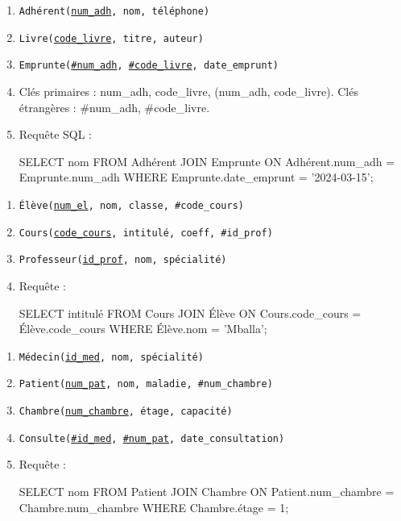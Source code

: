 \begin{enumerate}
    \item \texttt{Adhérent(\underline{num\_adh}, nom, téléphone)}
    \item \texttt{Livre(\underline{code\_livre}, titre, auteur)}
    \item \texttt{Emprunte(\underline{\#num\_adh}, \underline{\#code\_livre}, date\_emprunt)}
    \item Clés primaires : num\_adh, code\_livre, (num\_adh, code\_livre). Clés étrangères : \#num\_adh, \#code\_livre.
    \item Requête SQL :
    \begin{sqlcode}
SELECT nom FROM Adhérent
JOIN Emprunte ON Adhérent.num_adh = Emprunte.num_adh
WHERE Emprunte.date_emprunt = '2024-03-15';
    \end{sqlcode}
\end{enumerate}

\begin{enumerate}
    \item \texttt{Élève(\underline{num\_el}, nom, classe, \#code\_cours)}
    \item \texttt{Cours(\underline{code\_cours}, intitulé, coeff, \#id\_prof)}
    \item \texttt{Professeur(\underline{id\_prof}, nom, spécialité)}
    \item Requête :
    \begin{sqlcode}
SELECT intitulé FROM Cours
JOIN Élève ON Cours.code_cours = Élève.code_cours
WHERE Élève.nom = 'Mballa';
    \end{sqlcode}
\end{enumerate}

\begin{enumerate}
    \item \texttt{Médecin(\underline{id\_med}, nom, spécialité)}
    \item \texttt{Patient(\underline{num\_pat}, nom, maladie, \#num\_chambre)}
    \item \texttt{Chambre(\underline{num\_chambre}, étage, capacité)}
    \item \texttt{Consulte(\underline{\#id\_med}, \underline{\#num\_pat}, date\_consultation)}
    \item Requête :
    \begin{sqlcode}
SELECT nom FROM Patient
JOIN Chambre ON Patient.num_chambre = Chambre.num_chambre
WHERE Chambre.étage = 1;
    \end{sqlcode}
\end{enumerate}

